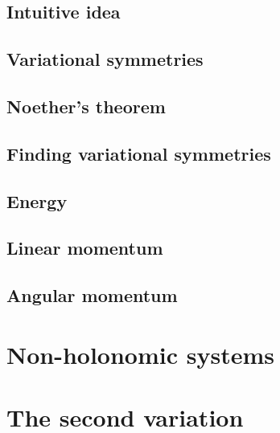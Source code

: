 \section{Intuitive idea}
\section{Variational symmetries}
\section{Noether's theorem}
\section{Finding variational symmetries}
\section{Energy}
\section{Linear momentum}
\section{Angular momentum}

\chapter{Non-holonomic systems}

\chapter{The second variation}